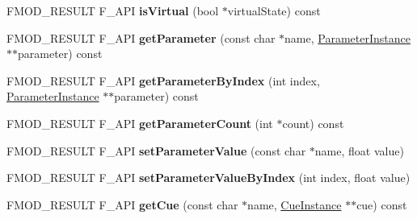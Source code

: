 \begin{DoxyCompactItemize}
\item 
\hypertarget{class_f_m_o_d_1_1_studio_1_1_event_instance_a53abd8ddcddec1901a45375912c49465}{F\+M\+O\+D\+\_\+\+R\+E\+S\+U\+L\+T F\+\_\+\+A\+P\+I {\bfseries is\+Virtual} (bool $\ast$virtual\+State) const }\label{class_f_m_o_d_1_1_studio_1_1_event_instance_a53abd8ddcddec1901a45375912c49465}

\item 
\hypertarget{class_f_m_o_d_1_1_studio_1_1_event_instance_a89fcd9699984089b00bd1625b3e4ae0b}{F\+M\+O\+D\+\_\+\+R\+E\+S\+U\+L\+T F\+\_\+\+A\+P\+I {\bfseries get\+Parameter} (const char $\ast$name, \hyperlink{class_f_m_o_d_1_1_studio_1_1_parameter_instance}{Parameter\+Instance} $\ast$$\ast$parameter) const }\label{class_f_m_o_d_1_1_studio_1_1_event_instance_a89fcd9699984089b00bd1625b3e4ae0b}

\item 
\hypertarget{class_f_m_o_d_1_1_studio_1_1_event_instance_a1e9b320489d2219126d999d8d9fb2c18}{F\+M\+O\+D\+\_\+\+R\+E\+S\+U\+L\+T F\+\_\+\+A\+P\+I {\bfseries get\+Parameter\+By\+Index} (int index, \hyperlink{class_f_m_o_d_1_1_studio_1_1_parameter_instance}{Parameter\+Instance} $\ast$$\ast$parameter) const }\label{class_f_m_o_d_1_1_studio_1_1_event_instance_a1e9b320489d2219126d999d8d9fb2c18}

\item 
\hypertarget{class_f_m_o_d_1_1_studio_1_1_event_instance_aece2bebf19eb679929cc49c347218666}{F\+M\+O\+D\+\_\+\+R\+E\+S\+U\+L\+T F\+\_\+\+A\+P\+I {\bfseries get\+Parameter\+Count} (int $\ast$count) const }\label{class_f_m_o_d_1_1_studio_1_1_event_instance_aece2bebf19eb679929cc49c347218666}

\item 
\hypertarget{class_f_m_o_d_1_1_studio_1_1_event_instance_aca52eec7f7b53cf4ebfcc4241e85960b}{F\+M\+O\+D\+\_\+\+R\+E\+S\+U\+L\+T F\+\_\+\+A\+P\+I {\bfseries set\+Parameter\+Value} (const char $\ast$name, float value)}\label{class_f_m_o_d_1_1_studio_1_1_event_instance_aca52eec7f7b53cf4ebfcc4241e85960b}

\item 
\hypertarget{class_f_m_o_d_1_1_studio_1_1_event_instance_a3e977541a058767096e229782d5f1175}{F\+M\+O\+D\+\_\+\+R\+E\+S\+U\+L\+T F\+\_\+\+A\+P\+I {\bfseries set\+Parameter\+Value\+By\+Index} (int index, float value)}\label{class_f_m_o_d_1_1_studio_1_1_event_instance_a3e977541a058767096e229782d5f1175}

\item 
\hypertarget{class_f_m_o_d_1_1_studio_1_1_event_instance_a037542d9499bc4b44fe614ab61032490}{F\+M\+O\+D\+\_\+\+R\+E\+S\+U\+L\+T F\+\_\+\+A\+P\+I {\bfseries get\+Cue} (const char $\ast$name, \hyperlink{class_f_m_o_d_1_1_studio_1_1_cue_instance}{Cue\+Instance} $\ast$$\ast$cue) const }\label{class_f_m_o_d_1_1_studio_1_1_event_instance_a037542d9499bc4b44fe614ab61032490}


\end{DoxyCompactItemize}
